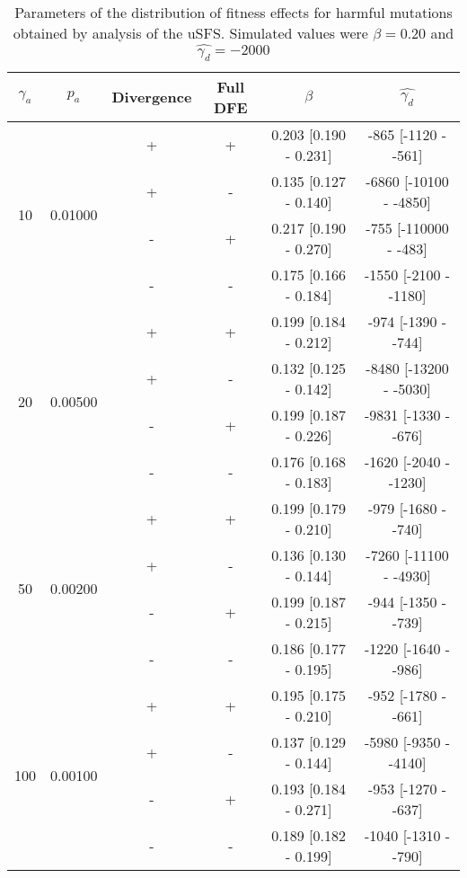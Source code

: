 
\begin{table}[H]
   \centering
   \begin{threeparttable}[b]
\caption{Parameters of the distribution of fitness effects for harmful mutations obtained by analysis of the uSFS. Simulated values were $\beta = 0.20$ and $\hat{\gamma_d} = -2000$  }

\begin{tabular}{cccccc}
\toprule
$\gamma_a$ & $p_a$ & Divergence\tnote{a} & Full DFE\tnote{b} & $\beta$\tnote{c} & $\hat{\gamma_d}$ \tnote{d} \\
\midrule
 \multirow{4}{*}{10}&\multirow{4}{*}{0.01000}&        + &        + &  0.203 [0.190 - 0.231] &  -865 [-1120 -  -561] \\
 &&        + &        - &  0.135 [0.127 - 0.140] & -6860 [-10100 -  -4850] \\
 &&        - &        + &  0.217 [0.190 - 0.270] &  -755 [-110000 -  -483] \\
 &&        - &        - &  0.175 [0.166 - 0.184] & -1550 [-2100 -  -1180] \\ \hline
 \multirow{4}{*}{20}&\multirow{4}{*}{0.00500}&        + &        + &  0.199 [0.184 - 0.212] &  -974 [-1390 -  -744] \\
 &&        + &        - &  0.132 [0.125 - 0.142] & -8480 [-13200 -  -5030] \\
 &&        - &        + &  0.199 [0.187 - 0.226] & -9831 [-1330 -  -676] \\
 &&        - &        - &  0.176 [0.168 - 0.183] & -1620 [-2040 -  -1230] \\ \hline
 \multirow{4}{*}{50}&\multirow{4}{*}{0.00200}&        + &        + &  0.199 [0.179 - 0.210] &  -979 [-1680 -  -740] \\
 &&        + &        - &  0.136 [0.130 - 0.144] & -7260 [-11100 -  -4930] \\
 &&        - &        + &  0.199 [0.187 - 0.215] &  -944 [-1350 -  -739] \\
   &&      - &        - &  0.186 [0.177 - 0.195] & -1220 [-1640 -  -986] \\ \hline
      \multirow{4}{*}{100}&\multirow{4}{*}{0.00100}&   + &        + &  0.195 [0.175 - 0.210] &  -952 [-1780 -  -661] \\
       &&  + &        - &  0.137 [0.129 - 0.144] & -5980 [-9350 -  -4140] \\
         &&- &        + &  0.193 [0.184 - 0.271] &  -953 [-1270 -  -637] \\
&&         - &        - &  0.189 [0.182 - 0.199] & -1040 [-1310 -  -790] \\ \hline

\end{tabular}
\end{threeparttable}
\end{table}
